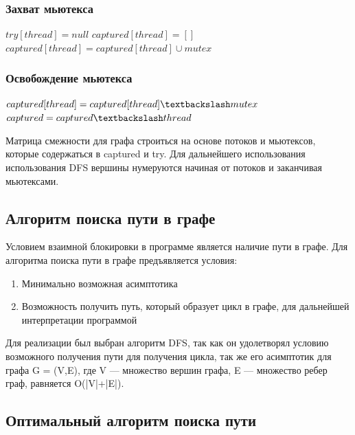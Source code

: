 \subsubsection{Захват мьютекса}
\begin{algorithmic}
    \State $try[thread] = null$
        \State $captured[thread] = []$
    \EndIf
    \State $captured[thread] = captured[thread] \cup mutex$
\EndFunction
\end{algorithmic}

\subsubsection{Освобождение мьютекса}
\begin{algorithmic}
    \State $captured[thread] = captured[thread] \textbackslash mutex$
        \State $captured = captured \textbackslash thread$
    \EndIf
\EndFunction
\end{algorithmic}

Матрица смежности для графа строиться на основе потоков и мьютексов, которые содержаться в captured и try. Для дальнейшего использования использования DFS вершины нумеруются начиная от потоков и заканчивая мьютексами.

\subsection{Алгоритм поиска пути в графе}

Условием взаимной блокировки в программе является наличие пути в графе. Для алгоритма поиска пути в графе предъявляется условия:

\begin{enumerate}
    \item Минимально возможная асимптотика
    \item Возможность получить путь, который образует цикл в графе, для дальнейшей интерпретации программой 
\end{enumerate}

Для реализации был выбран алгоритм DFS\cite{dsa}, так как он удолетворял условию возможного получения пути для получения цикла, так же его асимптотик для графа  G = (V,E), где V — множество вершин графа, E — множество ребер граф, равняется O(|V|+|E|).


\subsection{Оптимальный алгоритм поиска пути}


